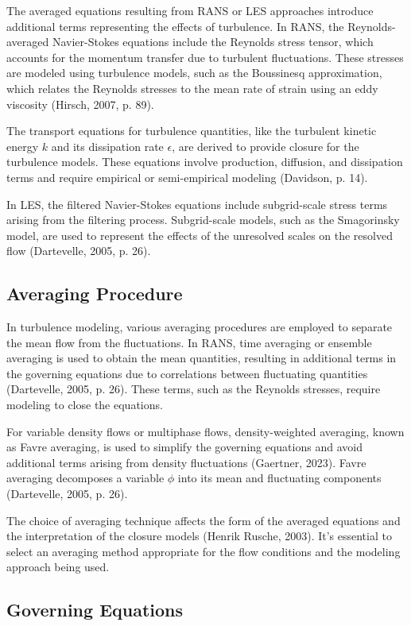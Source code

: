 The averaged equations resulting from RANS or LES approaches introduce additional terms representing the effects of turbulence. 
In RANS, the Reynolds-averaged Navier-Stokes equations include the Reynolds stress tensor, which accounts for the momentum transfer 
due to turbulent fluctuations. These stresses are modeled using turbulence models, such as the Boussinesq approximation, which relates 
the Reynolds stresses to the mean rate of strain using an eddy viscosity (Hirsch, 2007, p. 89).

The transport equations for turbulence quantities, like the turbulent kinetic energy $k$ and its dissipation rate $\epsilon$, are derived to 
provide closure for the turbulence models. These equations involve production, diffusion, and dissipation terms and require empirical or 
semi-empirical modeling (Davidson, p. 14).

In LES, the filtered Navier-Stokes equations include subgrid-scale stress terms arising from the filtering process. Subgrid-scale models, 
such as the Smagorinsky model, are used to represent the effects of the unresolved scales on the resolved flow (Dartevelle, 2005, p. 26).
\subsection{Averaging Procedure}
In turbulence modeling, various averaging procedures are employed to separate the mean flow from the fluctuations. In RANS, time 
averaging or ensemble averaging is used to obtain the mean quantities, resulting in additional terms in the governing equations due to correlations 
between fluctuating quantities (Dartevelle, 2005, p. 26). These terms, such as the Reynolds stresses, require modeling to close the equations.

For variable density flows or multiphase flows, density-weighted averaging, known as Favre averaging, is used to simplify the governing equations and 
avoid additional terms arising from density fluctuations (Gaertner, 2023). Favre averaging decomposes a variable $\phi$ into its mean and fluctuating 
components (Dartevelle, 2005, p. 26).

The choice of averaging technique affects the form of the averaged equations and the interpretation of the closure models (Henrik Rusche, 2003). 
It's essential to select an averaging method appropriate for the flow conditions and the modeling approach being used.
\subsection{Governing Equations}
